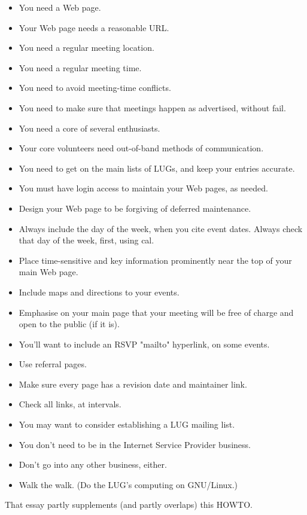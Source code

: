 \begin{itemize}
\item You need a Web page.
\item Your Web page needs a reasonable URL.
\item You need a regular meeting location.
\item You need a regular meeting time.
\item You need to avoid meeting-time conflicts.
\item You need to make sure that meetings happen as advertised, without fail.
\item You need a core of several enthusiasts.
\item Your core volunteers need out-of-band methods of communication.
\item You need to get on the main lists of LUGs, and keep your entries accurate.
\item You must have login access to maintain your Web pages, as needed.
\item Design your Web page to be forgiving of deferred maintenance.
\item Always include the day of the week, when you cite event dates. Always check that day of the week, first, using cal.
\item Place time-sensitive and key information prominently near the top of your main Web page.
\item Include maps and directions to your events.
\item Emphasise on your main page that your meeting will be free of charge and open to the public (if it is).
\item You'll want to include an RSVP "mailto" hyperlink, on some events.
\item Use referral pages.
\item Make sure every page has a revision date and maintainer link.
\item Check all links, at intervals.
\item You may want to consider establishing a LUG mailing list.
\item You don't need to be in the Internet Service Provider business.
\item Don't go into any other business, either.
\item Walk the walk. (Do the LUG's computing on GNU/Linux.)
\end{itemize}


That essay partly supplements (and partly overlaps) this HOWTO.

